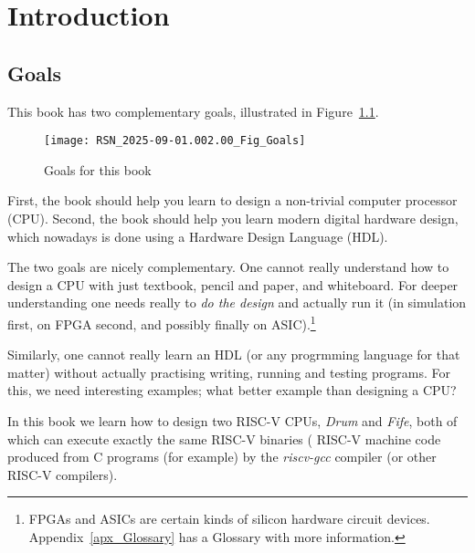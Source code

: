 

\chapter{Introduction}



\setcounter{page}{1}
\renewcommand{\thepage}{\arabic{chapter}-\arabic{page}}

\label{ch_intro}


\section{Goals}

\label{Sec_Goals}

This book has two complementary goals, illustrated in Figure~\ref{Fig_Goals}.
\begin{figure}[htbp]
  \centerline{\texttt{[image: RSN\_2025-09-01.002.00\_Fig\_Goals]}}
  \caption{\label{Fig_Goals}Goals for this book}
\end{figure}

First, the book should help you learn to design a non-trivial computer
processor (CPU).  Second, the book should help you learn modern
digital hardware design, which nowadays is done using a Hardware
Design Language (HDL).

The two goals are nicely complementary.  One cannot really understand
how to design a CPU with just textbook, pencil and paper, and
whiteboard.  For deeper understanding one needs really to \emph{do the
design} and actually run it (in simulation first, on FPGA second, and
possibly finally on ASIC).\footnote{FPGAs and ASICs are certain kinds
of silicon hardware circuit devices.  Appendix~\ref{apx_Glossary} has
a Glossary with more information.}

Similarly, one cannot really learn an HDL (or any progrmming language
for that matter) without actually practising writing, running and
testing programs.  For this, we need interesting examples; what better
example than designing a CPU?

In this book we learn how to design two RISC-V CPUs, \emph{Drum} and
\emph{Fife}, both of which can execute exactly the same RISC-V
binaries ({\ie} RISC-V machine code produced from C programs (for
example) by the \emph{riscv-gcc} compiler (or other RISC-V compilers).


